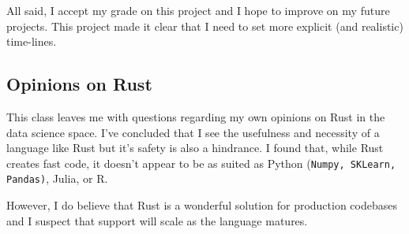 \documentclass[12pt,letterpaper]{article}
\begin{document}
All said, I accept my grade on this project and I hope to improve on my future projects. This project made it clear that I need to set more explicit (and realistic) time-lines. 

\subsection{Opinions on Rust}
This class leaves me with questions regarding my own opinions on Rust in the data science space. I've concluded that I see the usefulness and necessity of a language like Rust but it's safety is also a hindrance.  I found that, while Rust creates fast code, it doesn't appear to be as suited as Python (\texttt{Numpy, SKLearn, Pandas)}, Julia, or R.  

However, I do believe that Rust is a wonderful solution for production codebases and I suspect that support will scale as the language matures. 
\end{document}
